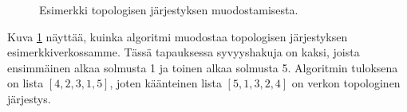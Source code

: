 \begin{figure}
\begin{center}
\end{center}
\caption{Esimerkki topologisen järjestyksen muodostamisesta.}
\label{fig:topesi}
\end{figure}

Kuva \ref{fig:topesi} näyttää, kuinka algoritmi muodostaa topologisen
järjestyksen esimerkkiverkossamme.
Tässä tapauksessa syvyyshakuja on kaksi,
joista ensimmäinen alkaa solmusta 1 ja toinen alkaa solmusta 5.
Algoritmin tuloksena on lista $[4,2,3,1,5]$,
joten käänteinen lista $[5,1,3,2,4]$ on verkon topologinen järjestys.

